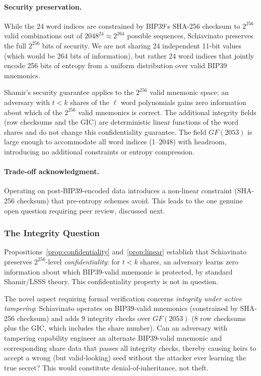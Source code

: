 \documentclass[11pt]{article}
\begin{document}
\paragraph{Security preservation.} While the 24 word indices are constrained by BIP39's SHA-256 checksum to $2^{256}$ valid combinations out of $2048^{24} \approx 2^{264}$ possible sequences, Schiavinato preserves the full $2^{256}$ bits of security. We are not sharing 24 independent 11-bit values (which would be 264 bits of information), but rather 24 word indices that jointly encode 256 bits of entropy from a uniform distribution over valid BIP39 mnemonics.

Shamir's security guarantee applies to the $2^{256}$ valid mnemonic space: an adversary with $t < k$ shares of the $\ell$ word polynomials gains zero information about which of the $2^{256}$ valid mnemonics is correct. The additional integrity fields (row checksums and the GIC) are deterministic linear functions of the word shares and do not change this confidentiality guarantee. The field $GF(2053)$ is large enough to accommodate all word indices (1--2048) with headroom, introducing no additional constraints or entropy compression.

\paragraph{Trade-off acknowledgment.} Operating on post-BIP39-encoded data introduces a non-linear constraint (SHA-256 checksum) that pre-entropy schemes avoid. This leads to the one genuine open question requiring peer review, discussed next.

\subsubsection{The Integrity Question}

Propositions~\ref{prop:confidentiality} and~\ref{prop:linear} establish that Schiavinato preserves $2^{256}$-level \textit{confidentiality}: for $t < k$ shares, an adversary learns zero information about which BIP39-valid mnemonic is protected, by standard Shamir/LSSS theory. This confidentiality property is not in question.

The novel aspect requiring formal verification concerns \textit{integrity under active tampering}: Schiavinato operates on BIP39-valid mnemonics (constrained by SHA-256 checksum) and adds 9 integrity checks over $GF(2053)$ (8 row checksums plus the GIC, which includes the share number). Can an adversary with tampering capability engineer an alternate BIP39-valid mnemonic and corresponding share data that passes all integrity checks, thereby causing heirs to accept a wrong (but valid-looking) seed without the attacker ever learning the true secret? This would constitute denial-of-inheritance, not theft.
\end{document}
